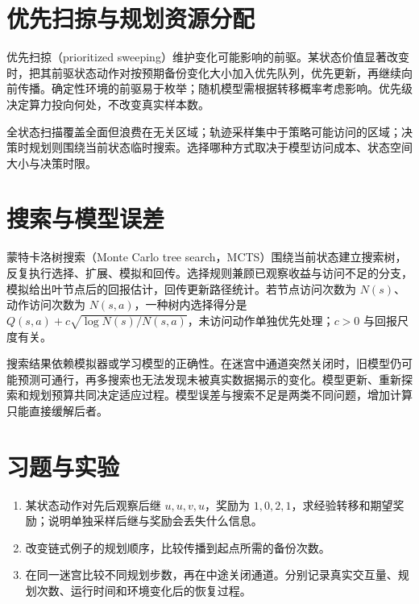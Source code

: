 \section{优先扫掠与规划资源分配}

优先扫掠（prioritized sweeping）维护变化可能影响的前驱。某状态价值显著改变时，把其前驱状态动作对按预期备份变化大小加入优先队列，优先更新，再继续向前传播。确定性环境的前驱易于枚举；随机模型需根据转移概率考虑影响。优先级决定算力投向何处，不改变真实样本数。

全状态扫描覆盖全面但浪费在无关区域；轨迹采样集中于策略可能访问的区域；决策时规划则围绕当前状态临时搜索。选择哪种方式取决于模型访问成本、状态空间大小与决策时限。

\section{搜索与模型误差}

蒙特卡洛树搜索（Monte Carlo tree search，MCTS）围绕当前状态建立搜索树，反复执行选择、扩展、模拟和回传。选择规则兼顾已观察收益与访问不足的分支，模拟给出叶节点后的回报估计，回传更新路径统计。若节点访问次数为 $N(s)$、动作访问次数为 $N(s,a)$，一种树内选择得分是 $Q(s,a)+c\sqrt{\log N(s)/N(s,a)}$，未访问动作单独优先处理；$c>0$ 与回报尺度有关。

搜索结果依赖模拟器或学习模型的正确性。在迷宫中通道突然关闭时，旧模型仍可能预测可通行，再多搜索也无法发现未被真实数据揭示的变化。模型更新、重新探索和规划预算共同决定适应过程。模型误差与搜索不足是两类不同问题，增加计算只能直接缓解后者。

\section{习题与实验}
\begin{enumerate}
\item 某状态动作对先后观察后继 $u,u,v,u$，奖励为 $1,0,2,1$，求经验转移和期望奖励；说明单独采样后继与奖励会丢失什么信息。
\item 改变链式例子的规划顺序，比较传播到起点所需的备份次数。
\item 在同一迷宫比较不同规划步数，再在中途关闭通道。分别记录真实交互量、规划次数、运行时间和环境变化后的恢复过程。
\end{enumerate}




